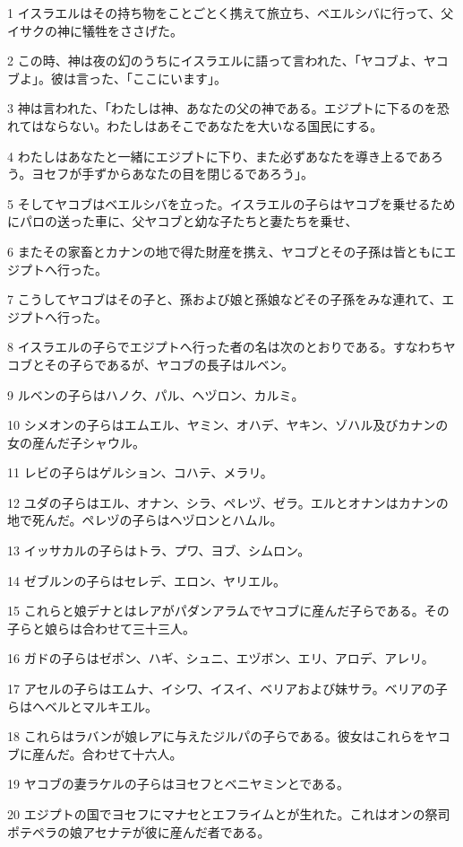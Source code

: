 \par 1 イスラエルはその持ち物をことごとく携えて旅立ち、ベエルシバに行って、父イサクの神に犠牲をささげた。
\par 2 この時、神は夜の幻のうちにイスラエルに語って言われた、「ヤコブよ、ヤコブよ」。彼は言った、「ここにいます」。
\par 3 神は言われた、「わたしは神、あなたの父の神である。エジプトに下るのを恐れてはならない。わたしはあそこであなたを大いなる国民にする。
\par 4 わたしはあなたと一緒にエジプトに下り、また必ずあなたを導き上るであろう。ヨセフが手ずからあなたの目を閉じるであろう」。
\par 5 そしてヤコブはベエルシバを立った。イスラエルの子らはヤコブを乗せるためにパロの送った車に、父ヤコブと幼な子たちと妻たちを乗せ、
\par 6 またその家畜とカナンの地で得た財産を携え、ヤコブとその子孫は皆ともにエジプトへ行った。
\par 7 こうしてヤコブはその子と、孫および娘と孫娘などその子孫をみな連れて、エジプトへ行った。
\par 8 イスラエルの子らでエジプトへ行った者の名は次のとおりである。すなわちヤコブとその子らであるが、ヤコブの長子はルベン。
\par 9 ルベンの子らはハノク、パル、ヘヅロン、カルミ。
\par 10 シメオンの子らはエムエル、ヤミン、オハデ、ヤキン、ゾハル及びカナンの女の産んだ子シャウル。
\par 11 レビの子らはゲルション、コハテ、メラリ。
\par 12 ユダの子らはエル、オナン、シラ、ペレヅ、ゼラ。エルとオナンはカナンの地で死んだ。ペレヅの子らはヘヅロンとハムル。
\par 13 イッサカルの子らはトラ、プワ、ヨブ、シムロン。
\par 14 ゼブルンの子らはセレデ、エロン、ヤリエル。
\par 15 これらと娘デナとはレアがパダンアラムでヤコブに産んだ子らである。その子らと娘らは合わせて三十三人。
\par 16 ガドの子らはゼポン、ハギ、シュニ、エヅボン、エリ、アロデ、アレリ。
\par 17 アセルの子らはエムナ、イシワ、イスイ、ベリアおよび妹サラ。ベリアの子らはヘベルとマルキエル。
\par 18 これらはラバンが娘レアに与えたジルパの子らである。彼女はこれらをヤコブに産んだ。合わせて十六人。
\par 19 ヤコブの妻ラケルの子らはヨセフとベニヤミンとである。
\par 20 エジプトの国でヨセフにマナセとエフライムとが生れた。これはオンの祭司ポテペラの娘アセナテが彼に産んだ者である。
